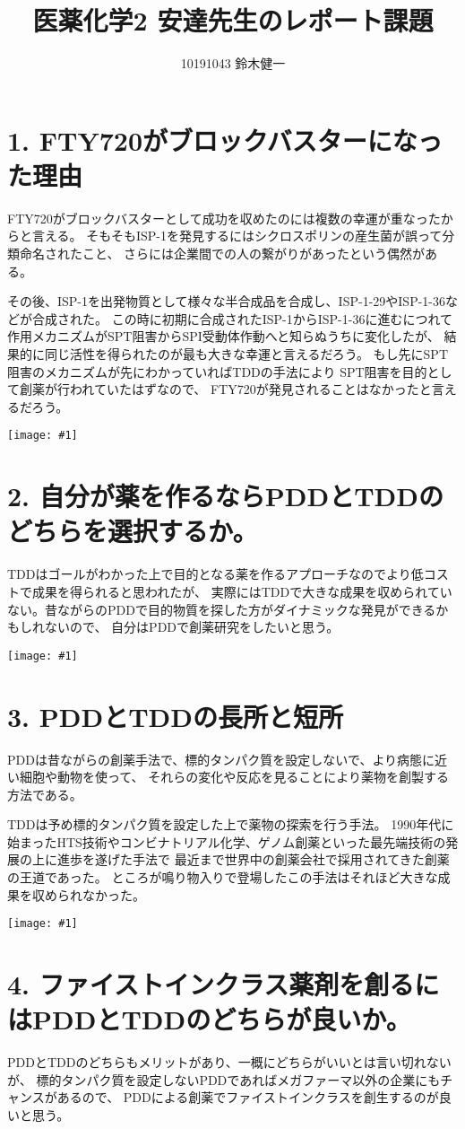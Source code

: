 \documentclass[a4paper,papersize,dvipdfmx]{jsarticle}
\newcommand{\pict}[2]{\begin{center} \texttt{[image: \#1]} \end{center}}   %
\begin{document}
\title{医薬化学2 安達先生のレポート課題}
\author{10191043 鈴木健一}
\date{}
\maketitle


\section*{1. FTY720がブロックバスターになった理由}
FTY720がブロックバスターとして成功を収めたのには複数の幸運が重なったからと言える。
そもそもISP-1を発見するにはシクロスポリンの産生菌が誤って分類命名されたこと、
さらには企業間での人の繋がりがあったという偶然がある。

その後、ISP-1を出発物質として様々な半合成品を合成し、ISP-1-29やISP-1-36などが合成された。
この時に初期に合成されたISP-1からISP-1-36に進むにつれて作用メカニズムがSPT阻害からSPI受動体作動へと知らぬうちに変化したが、
結果的に同じ活性を得られたのが最も大きな幸運と言えるだろう。
もし先にSPT阻害のメカニズムが先にわかっていればTDDの手法により
SPT阻害を目的として創薬が行われていたはずなので、
FTY720が発見されることはなかったと言えるだろう。

\pict{sl1.JPG}{8}

\section*{2. 自分が薬を作るならPDDとTDDのどちらを選択するか。}
TDDはゴールがわかった上で目的となる薬を作るアプローチなのでより低コストで成果を得られると思われたが、
実際にはTDDで大きな成果を収められていない。昔ながらのPDDで目的物質を探した方がダイナミックな発見ができるかもしれないので、
自分はPDDで創薬研究をしたいと思う。

\pict{sl2.JPG}{8}

\section*{3. PDDとTDDの長所と短所}
PDDは昔ながらの創薬手法で、標的タンパク質を設定しないで、より病態に近い細胞や動物を使って、
それらの変化や反応を見ることにより薬物を創製する方法である。

TDDは予め標的タンパク質を設定した上で薬物の探索を行う手法。
1990年代に始まったHTS技術やコンビナトリアル化学、ゲノム創薬といった最先端技術の発展の上に進歩を遂げた手法で
最近まで世界中の創薬会社で採用されてきた創薬の王道であった。
ところが鳴り物入りで登場したこの手法はそれほど大きな成果を収められなかった。

\pict{sl3.JPG}{8}

\section*{4. ファイストインクラス薬剤を創るにはPDDとTDDのどちらが良いか。}
PDDとTDDのどちらもメリットがあり、一概にどちらがいいとは言い切れないが、
標的タンパク質を設定しないPDDであればメガファーマ以外の企業にもチャンスがあるので、
PDDによる創薬でファイストインクラスを創生するのが良いと思う。
\end{document}
